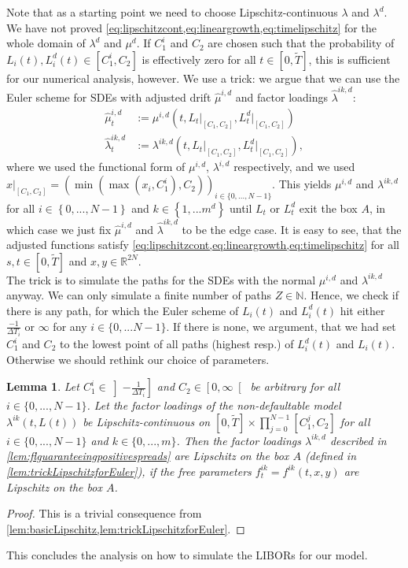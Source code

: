 \documentclass[12pt]{article}
\newtheorem{lemma}[theorem]{Lemma}
\begin{document}
	Note that as a starting point we need to choose Lipschitz-continuous $\lambda$ and $\lambda^d$.\\
	We have not proved \cref{eq:lipschitzcont,eq:lineargrowth,eq:timelipschitz} for the whole domain of $\lambda^d$ and $\mu^d$. If $C^i_1$ and $C_2$ are chosen such that the probability of $L_i(t), L^d_i(t)\in \left[C^i_1, C_2\right]$ is effectively zero for all $t\in \left[0,\tilde{T}\right]$, this is sufficient for our numerical analysis, however. We use a trick: we argue that we can use the Euler scheme for SDEs with adjusted drift $\hat{\mu}^{i,d}$ and factor loadings $\hat{\lambda}^{i k, d}$:
	\begin{align*}
		\hat{\mu}^{i,d}_t &:= \mu^{i,d}\left(t, L_t\big|_{\left[C_1,C_2\right]}, L^d_t\big|_{\left[C_1,C_2\right]} \right)\\
		\hat{\lambda}^{i k, d}_t &:= \lambda^{i k,d}\left(t,  L_t\big|_{\left[C_1,C_2\right]}, L^d_t\big|_{\left[C_1,C_2\right]}\right),
	\end{align*}
	where we used the functional form of $\mu^{i,d}$, $\lambda^{i,d}$ respectively, and we used $x\big|_{\left[C_1,C_2\right]} = \left(\min\left(\max\left(x_i, C^i_1\right), C_2\right)\right)_{i\in\{0,...,N-1\}}$. This yields $\mu^{i,d}$ and $\lambda^{i k,d}$ for all $i \in \left\{0,...,N-1\right\}$ and $k\in\left\{1,...m^d\right\}$ until $L_t$ or $L^d_t$ exit the box $A$, in which case we just fix $\hat{\mu}^{i,d}$ and $\hat{\lambda}^{i k,d}$ to be the edge case. It is easy to see, that the adjusted functions satisfy \cref{eq:lipschitzcont,eq:lineargrowth,eq:timelipschitz} for all $s,t\in\left[0,\tilde{T}\right]$ and $x,y\in\mathbb{R}^{2N}$.\\
	The trick is to simulate the paths for the SDEs with the normal $\mu^{i,d}$ and $\lambda^{i k,d}$ anyway. We can only simulate a finite number of paths $Z\in\mathbb{N}$. Hence, we check if there is any path, for which the Euler scheme of $L_i(t)$ and $L^d_i(t)$ hit either $\frac{-1}{\Delta T_i}$ or $\infty$ for any $i\in\{0,...N-1\}$. If there is none, we argument, that we had set $C^i_1$ and $C_2$ to the lowest point of all paths (highest resp.) of $L^d_i(t)$ and $L_i(t)$. Otherwise we should rethink our choice of parameters.
	\begin{lemma}
		Let $C^i_1\in\left]-\frac{1}{\Delta T_i}\right]$ and $C_2\in \left[0, \infty\right[$ be arbitrary for all $i \in \{0,...,N-1\}$. Let the factor loadings of the non-defaultable model $\lambda^{i k}(t,L(t))$ be Lipschitz-continuous on $\left[0,\tilde{T}\right]\times\prod_{j=0}^{N-1}\left[C^j_1,C_2\right]$ for all $i \in \{0,...,N-1\}$ and $k \in \{0,...,m\}$.
		Then the factor loadings $\lambda^{i k, d}$ described in \cref{lem:flguaranteeingpositivespreads} are Lipschitz on the box $A$ (defined in \cref{lem:trickLipschitzforEuler}), if the free parameters $f^{i k}_t=f^{i k}(t,x,y)$ are Lipschitz on the box $A$.
	\end{lemma}
	\begin{proof}
		This is a trivial consequence from \cref{lem:basicLipschitz,lem:trickLipschitzforEuler}.
	\end{proof}
	This concludes the analysis on how to simulate the LIBORs for our model.
	
\end{document}

